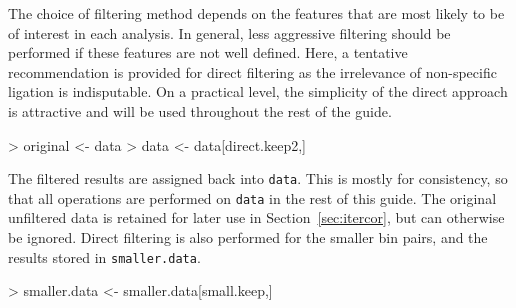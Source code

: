 \documentclass[12pt]{report}
\renewenvironment{Schunk}{\vspace{0pt}}{\vspace{0pt}}
\newcommand{\code}[1]{{\small\texttt{#1}}}
\begin{document}
% 
% 
% 

The choice of filtering method depends on the features that are most likely to be of interest in each analysis.
In general, less aggressive filtering should be performed if these features are not well defined.
Here, a tentative recommendation is provided for direct filtering as the irrelevance of non-specific ligation is indisputable.
On a practical level, the simplicity of the direct approach is attractive and will be used throughout the rest of the guide.

\begin{Schunk}
\begin{Sinput}
> original <- data
> data <- data[direct.keep2,] 
\end{Sinput}
\end{Schunk}

The filtered results are assigned back into \code{data}.
This is mostly for consistency, so that all operations are performed on \code{data} in the rest of this guide.
The original unfiltered data is retained for later use in Section~\ref{sec:itercor}, but can otherwise be ignored.
Direct filtering is also performed for the smaller bin pairs, and the results stored in \code{smaller.data}.

\begin{Schunk}
\begin{Sinput}
> smaller.data <- smaller.data[small.keep,]
\end{Sinput}
\end{Schunk}

\end{document}

